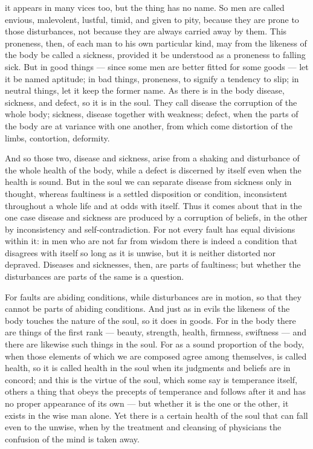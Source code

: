  it appears in many vices too, but the thing has no name. So men are called envious, malevolent, lustful, timid, and given to pity, because they are prone to those disturbances, not because they are always carried away by them. This proneness, then, of each man to his own particular kind, may from the likeness of the body be called a sickness, provided it be understood as a proneness to falling sick. But in good things — since some men are better fitted for some goods — let it be named aptitude; in bad things, proneness, to signify a tendency to slip; in neutral things, let it keep the former name. As there is in the body disease, sickness, and defect, so it is in the soul. They call disease the corruption of the whole body; sickness, disease together with weakness; defect, when the parts of the body are at variance with one another, from which come distortion of the limbs, contortion, deformity.

 And so those two, disease and sickness, arise from a shaking and disturbance of the whole health of the body, while a defect is discerned by itself even when the health is sound. But in the soul we can separate disease from sickness only in thought, whereas faultiness is a settled disposition or condition, inconsistent throughout a whole life and at odds with itself. Thus it comes about that in the one case disease and sickness are produced by a corruption of beliefs, in the other by inconsistency and self-contradiction. For not every fault has equal divisions within it: in men who are not far from wisdom there is indeed a condition that disagrees with itself so long as it is unwise, but it is neither distorted nor depraved. Diseases and sicknesses, then, are parts of faultiness; but whether the disturbances are parts of the same is a question.

 For faults are abiding conditions, while disturbances are in motion, so that they cannot be parts of abiding conditions. And just as in evils the likeness of the body touches the nature of the soul, so it does in goods. For in the body there are things of the first rank — beauty, strength, health, firmness, swiftness — and there are likewise such things in the soul. For as a sound proportion of the body, when those elements of which we are composed agree among themselves, is called health, so it is called health in the soul when its judgments and beliefs are in concord; and this is the virtue of the soul, which some say is temperance itself, others a thing that obeys the precepts of temperance and follows after it and has no proper appearance of its own — but whether it is the one or the other, it exists in the wise man alone. Yet there is a certain health of the soul that can fall even to the unwise, when by the treatment and cleansing of physicians the confusion of the mind is taken away.

